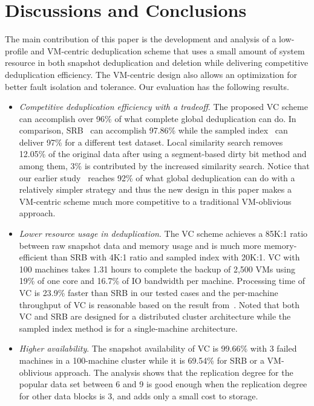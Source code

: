 \section{Discussions and Conclusions}
\label{sect:conclusion}
The main contribution of this paper is the development and analysis of a low-profile and VM-centric deduplication scheme that
uses  a small amount of system resource in both snapshot deduplication and deletion
while delivering competitive deduplication efficiency.
The VM-centric design also allows an optimization for  better fault isolation and tolerance.
Our evaluation has the following results.
\begin{itemize}
\item {\em Competitive deduplication efficiency with a tradeoff}. 
The proposed VC scheme 
can accomplish over  96\% of what complete global
deduplication can do. In comparison, SRB~\cite{Dong2011,extreme_binning09}
can accomplish 97.86\% while 
the sampled index~\cite{Guo2011} can deliver 97\% for a different test dataset. 
Local similarity search removes 12.05\% of the original data after using a segment-based
 dirty bit method and among them, 3\% is contributed by the increased similarity search.
Notice that our earlier study~\cite{WeiZhangIEEE} reaches 92\% of what global deduplication can do
with a relatively simpler strategy and thus the new design in this paper makes a
VM-centric scheme much more competitive to a traditional VM-oblivious approach.
\item {\em Lower resource usage in deduplication}. 
The VC scheme achieves a 85K:1 ratio between raw snapshot data and memory usage
and is much more memory-efficient than 
SRB  with 4K:1 ratio and sampled index with 20K:1.
VC with 100 machines takes 1.31 hours to complete the backup of 2,500 VMs
using 19\% of one core and 16.7\% of IO bandwidth per machine. 
Processing time of VC is 23.9\% faster  than SRB in our tested cases
and the per-machine throughput of VC is reasonable based on the result 
from~\cite{Guo2011}. 
Noted that both VC and SRB are designed for a distributed cluster architecture while
the sampled index method is for a single-machine architecture.
\item {\em Higher availability}. 
The snapshot availability of VC is 99.66\% with 3 failed machines in a 100-machine cluster
while it is 69.54\% for  SRB or a VM-oblivious approach.
The analysis shows that the replication degree
for the popular data set between 6 and 9 is good enough when the replication degree
for other data blocks is 3, and adds only a small cost to storage.
\end{itemize}
